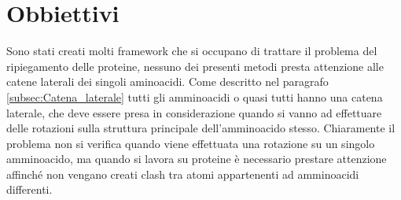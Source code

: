 \chapter{Obbiettivi}\label{chapter:obbiettivi}
Sono stati creati molti framework che si occupano di trattare il problema del ripiegamento delle proteine, nessuno dei presenti metodi presta attenzione alle catene laterali dei singoli aminoacidi. 
Come descritto nel paragrafo \ref{subsec:Catena_laterale} tutti gli amminoacidi o quasi tutti hanno una catena laterale, che deve essere presa in considerazione quando si vanno ad effettuare delle rotazioni sulla struttura principale dell'amminoacido stesso. Chiaramente il problema non si verifica quando viene effettuata una rotazione su un singolo amminoacido, ma quando si lavora su proteine è necessario prestare attenzione affinché non vengano creati clash tra atomi appartenenti ad amminoacidi differenti. 


